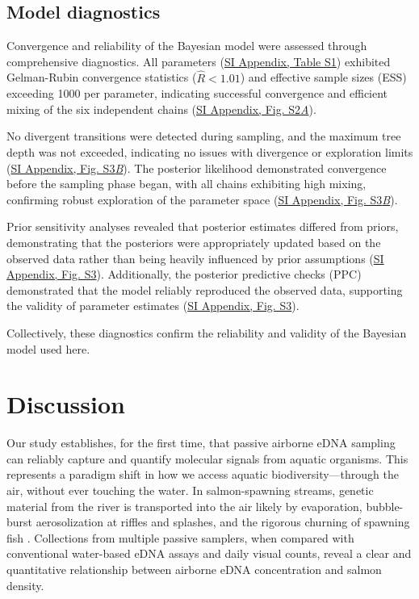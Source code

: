 \documentclass{article}
\begin{document}
\subsection{Model diagnostics}

Convergence and reliability of the Bayesian model were assessed through comprehensive diagnostics. All parameters (\href{SI_Appendix.pdf}{SI Appendix, Table S1}) exhibited Gelman-Rubin convergence statistics ($\hat{R} < 1.01$) and effective
sample sizes (ESS) exceeding 1000 per parameter, indicating successful convergence and efficient mixing of
the six independent chains (\href{SI_Appendix.pdf}{SI Appendix, Fig. S2\textit{A}}). 


No divergent transitions were detected during sampling, and the maximum tree depth was not exceeded, indicating no issues with divergence or exploration limits (\href{SI_Appendix.pdf}{SI Appendix, Fig. S3\textit{B}}). The posterior likelihood demonstrated convergence before the sampling phase began, with all chains exhibiting high mixing, confirming robust exploration of the parameter space (\href{SI_Appendix.pdf}{SI Appendix, Fig. S3\textit{B}}).

Prior sensitivity analyses revealed that posterior estimates differed from priors, demonstrating that the posteriors were appropriately updated based on the observed data rather than being heavily influenced by prior assumptions (\href{SI_Appendix.pdf}{SI Appendix, Fig. S3}). Additionally, the posterior predictive checks (PPC) demonstrated that the model reliably reproduced the observed data, supporting the validity of parameter estimates (\href{SI_Appendix.pdf}{SI Appendix, Fig. S3}). 

Collectively, these diagnostics confirm the reliability and validity of the Bayesian model used here.


\section{Discussion}
Our study establishes, for the first time, that passive airborne eDNA sampling can reliably capture and quantify molecular signals from aquatic organisms. This represents a paradigm shift in how we access aquatic biodiversity—through the air, without ever touching the water. In salmon-spawning streams, genetic material from the river is transported into the air likely by evaporation, bubble-burst aerosolization at riffles and splashes, and the rigorous churning of spawning fish \cite{wood2021,prather2013}. Collections from multiple passive samplers, when compared with conventional water-based eDNA assays and daily visual counts, reveal a clear and quantitative relationship between airborne eDNA concentration and salmon density. 
\end{document}
